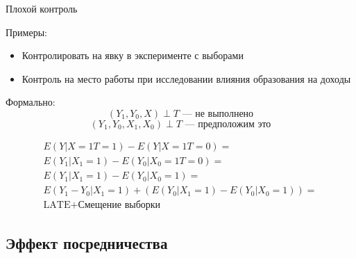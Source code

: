 \begin{frame}{Плохой контроль}

Примеры:
\begin{itemize}
    \item Контролировать на явку в эксперименте с выборами
    \item Контроль на место работы при исследовании влияния образования на доходы
\end{itemize}
    
\pause
    
Формально:
$$(Y_1, Y_0, X) \perp T\text{ --- не выполнено}$$
$$(Y_1, Y_0, X_1, X_0) \perp T\text{ --- предположим это}$$

\begin{gather*}
E(Y|X=1 T=1) - E(Y|X=1 T=0) = \\
E(Y_1|X_1=1) - E(Y_0|X_0=1 T=0) = \\
E(Y_1|X_1=1) - E(Y_0|X_0=1) =
\\E(Y_1 - Y_0|X_1=1) + (E(Y_0|X_1=1) - E(Y_0|X_0=1))= \\
\text{LATE} + \text{Смещение выборки}
\end{gather*}



\end{frame}

\subsection{Эффект посредничества}






